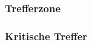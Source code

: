 \documentclass[a4paper,10pt,twoside,twocolumn,openany,nodeprecatedcode,bg=print]{dndbook}
\begin{document}
\subsubsection{Trefferzone}
\subsubsection{Kritische Treffer}

\clearpage



\end{document}
